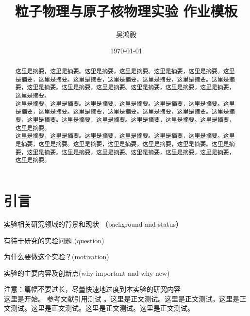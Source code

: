 \documentclass[prc,twocolumn,superscriptaddress,showkeys,showpacs,amssymb,amsmath,amsfonts,aps]{revtex4}
\begin{document}
\title{粒子物理与原子核物理实验 作业模板}
\author{吴鸿毅}


\date{\today}%

\begin{abstract}
这里是摘要，这里是摘要。这里是摘要，这里是摘要。这里是摘要，这里是摘要。这里是摘要，这里是摘要。这里是摘要，这里是摘要。这里是摘要，这里是摘要。这里是摘要，这里是摘要。这里是摘要，这里是摘要。这里是摘要，这里是摘要。这里是摘要，这里是摘要。\\
这里是摘要，这里是摘要。这里是摘要，这里是摘要。这里是摘要，这里是摘要。这里是摘要，这里是摘要。这里是摘要，这里是摘要。这里是摘要，这里是摘要。这里是摘要，这里是摘要。这里是摘要，这里是摘要。这里是摘要，这里是摘要。这里是摘要，这里是摘要。\\
这里是摘要，这里是摘要。这里是摘要，这里是摘要。这里是摘要，这里是摘要。这里是摘要，这里是摘要。这里是摘要，这里是摘要。这里是摘要，这里是摘要。这里是摘要，这里是摘要。这里是摘要，这里是摘要。这里是摘要，这里是摘要。这里是摘要，这里是摘要。
\end{abstract}

\maketitle

\section{引言}%
实验相关研究领域的背景和现状 （background and status）

有待于研究的实验问题 (question)

为什么要做这个实验？(motivation)

实验的主要内容及创新点(why important and why new)

注意：篇幅不要过长，尽量快速地过度到本实验的研究内容\\

这里是开始。 参考文献引用测试 \cite{Figueredo:2009dg}。这里是正文测试。这里是正文测试。这里是正文测试。这里是正文测试。这里是正文测试。这里是正文测试。
\end{document}
